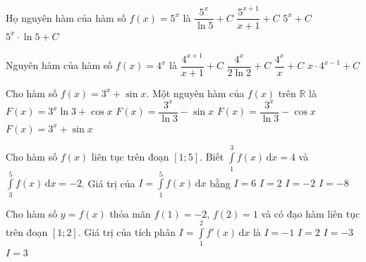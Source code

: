 \begin{ex}%
	Họ nguyên hàm của hàm số $f(x)=5^x$ là
	\choice
	{\True $\dfrac{5^x}{\ln 5}+C$}
	{$\dfrac{5^{x+1}}{x+1}+C$}
	{$5^x+C$}
	{$5^x \cdot \ln 5+C$}
\end{ex}

\begin{ex}%
Nguyên hàm của hàm số $f(x)=4^x$ là
\choice
{$\dfrac{4^{x+1}}{x+1}+C$}
{\True $\dfrac{4^x}{2\ln 2}+C$}
{$\dfrac{4^x}{x}+C$}
{$x \cdot 4^{x-1}+C$}
\end{ex}

\begin{ex}%
	Cho hàm số $f(x)=3^x+\sin x$. Một nguyên hàm của $f(x)$ trên $\mathbb{R}$ là
	\choice
	{$F(x)=3^x\ln 3 + \cos x$}
	{$F(x)=\dfrac{3^x}{\ln 3}-\sin x$}
	{\True $F(x)=\dfrac{3^x}{\ln 3}-\cos x$}
	{$F(x)=3^x+\sin x$}
\end{ex}

\begin{ex}%
	Cho hàm số $f(x)$ liên tục trên đoạn $[1;5]$. Biết $\displaystyle \int \limits_1^3 f(x) \mathrm{\,d}x = 4$ và $\displaystyle \int \limits_3^5 f(x) \mathrm{\,d}x = -2$. Giá trị của $I = \displaystyle \int \limits_1^5 f(x) \mathrm{\,d}x$ bằng
	\choice
	{$I = 6$}
	{\True $I = 2$}
	{$I = -2$}
	{$I = -8$}
\end{ex}

\begin{ex}%
	Cho hàm số $y = f(x)$ thỏa mãn $f(1) = -2$, $f(2) = 1$ và có đạo hàm liên tục trên đoạn $[1;2]$. Giá trị của tích phân $I = \displaystyle\int\limits_{1}^{2} f'(x)\mathrm{\,d}x$ là
	\choice
	{$I = -1$}
	{$I = 2$}
	{$I = -3$}
	{\True $I = 3$}
\end{ex}

